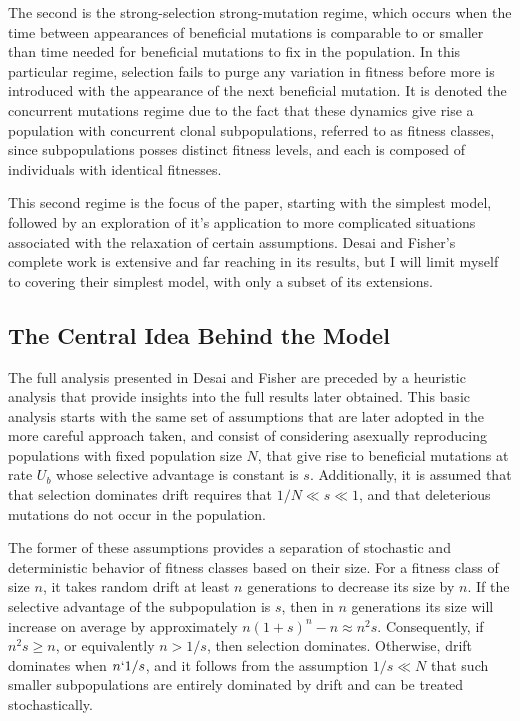\documentclass[12pt,twocolumn]{article}
\begin{document}
The second is the strong-selection strong-mutation regime, which occurs when the time between appearances of beneficial mutations is comparable to or smaller than time needed for beneficial mutations to fix in the population.  In this particular regime, selection fails to purge any variation in fitness before more is introduced with the appearance of the next beneficial mutation.  It is denoted the concurrent mutations regime due to the fact that these dynamics give rise a population with concurrent clonal subpopulations, referred to as fitness classes, since subpopulations posses distinct fitness levels, and each is composed of individuals with identical fitnesses.  

This second regime is the focus of the paper, starting with the simplest model, followed by an exploration of it's application to more complicated situations associated with the relaxation of certain assumptions.  Desai and Fisher's complete work is extensive and far reaching in its results, but I will limit myself to covering their simplest model, with only a subset of its extensions. 

\subsection*{The Central Idea Behind the Model}
The full analysis presented in Desai and Fisher are preceded by a heuristic analysis that provide insights into the full results later obtained.  This basic analysis starts with the same set of assumptions that are later adopted in the more careful approach taken, and consist of considering asexually reproducing populations with fixed population size $N$, that give rise to beneficial mutations at rate $U_b$ whose selective advantage is constant is $s$.  Additionally, it is assumed that that selection dominates drift requires that $1/N \ll s \ll 1$, and that deleterious mutations do not occur in the population. 

The former of these assumptions provides a separation of stochastic and deterministic behavior of fitness classes based on their size.  For a fitness class of size $n$, it takes random drift at least $n$ generations to decrease its size by $n$.  If the selective advantage of the subpopulation is $s$, then in $n$ generations its size will increase on average by approximately $n(1+s)^n-n \approx n^2s$.  Consequently, if $n^2s \ge n$, or equivalently $n>1/s$, then selection dominates.  Otherwise, drift dominates when $n\lq 1/s$, and it follows from the assumption $1/s \ll N$ that such smaller subpopulations are entirely dominated by drift and can be treated stochastically.
\end{document}
